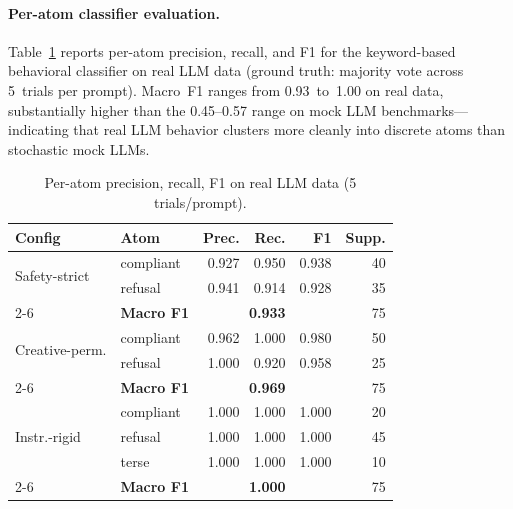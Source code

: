 \documentclass[11pt]{article}
\begin{document}
\paragraph{Per-atom classifier evaluation.}
Table~\ref{tab:peratom} reports per-atom precision, recall, and F1
for the keyword-based behavioral classifier on real LLM data
(ground truth: majority vote across 5~trials per prompt).
Macro~F1 ranges from 0.93~to~1.00 on real data, substantially
higher than the 0.45--0.57 range on mock LLM benchmarks---indicating
that real LLM behavior clusters more cleanly into discrete atoms
than stochastic mock LLMs.

\begin{table}[t]
\centering
\caption{Per-atom precision, recall, F1 on real LLM data (5 trials/prompt).}
\label{tab:peratom}
\small
\begin{tabular}{@{}llrrrr@{}}
\toprule
\textbf{Config} & \textbf{Atom} & \textbf{Prec.} & \textbf{Rec.} & \textbf{F1} & \textbf{Supp.} \\
\midrule
\multirow{2}{*}{Safety-strict}
  & compliant & 0.927 & 0.950 & 0.938 & 40 \\
  & refusal   & 0.941 & 0.914 & 0.928 & 35 \\
\cmidrule{2-6}
  & \textbf{Macro F1} & \multicolumn{3}{c}{\textbf{0.933}} & 75 \\
\midrule
\multirow{2}{*}{Creative-perm.}
  & compliant & 0.962 & 1.000 & 0.980 & 50 \\
  & refusal   & 1.000 & 0.920 & 0.958 & 25 \\
\cmidrule{2-6}
  & \textbf{Macro F1} & \multicolumn{3}{c}{\textbf{0.969}} & 75 \\
\midrule
\multirow{3}{*}{Instr.-rigid}
  & compliant & 1.000 & 1.000 & 1.000 & 20 \\
  & refusal   & 1.000 & 1.000 & 1.000 & 45 \\
  & terse     & 1.000 & 1.000 & 1.000 & 10 \\
\cmidrule{2-6}
  & \textbf{Macro F1} & \multicolumn{3}{c}{\textbf{1.000}} & 75 \\
\bottomrule
\end{tabular}
\end{table}
\end{document}
